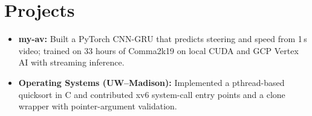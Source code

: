 \documentclass[11pt, letterpaper]{article}
\begin{document}
\section{Projects}
\begin{itemize}
  \item \textbf{my-av:} Built a PyTorch CNN-GRU that predicts steering and speed from 1\,s video; trained on 33 hours of Comma2k19 on local CUDA and GCP Vertex AI with streaming inference.
  \item \textbf{Operating Systems (UW--Madison):} Implemented a pthread-based quicksort in C and contributed xv6 system-call entry points and a clone wrapper with pointer-argument validation.
\end{itemize}
\end{document}
